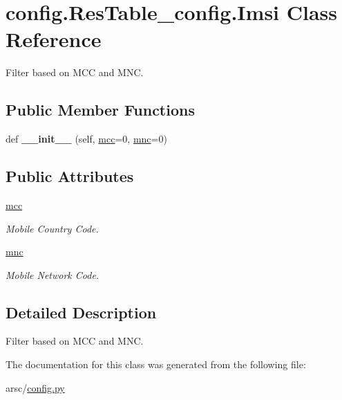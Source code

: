 \hypertarget{classconfig_1_1ResTable__config_1_1Imsi}{}\section{config.\+Res\+Table\+\_\+config.\+Imsi Class Reference}
\label{classconfig_1_1ResTable__config_1_1Imsi}


Filter based on M\+CC and M\+NC.  


\subsection*{Public Member Functions}
\begin{DoxyCompactItemize}
\item 
\mbox{\label{classconfig_1_1ResTable__config_1_1Imsi_abbf54b6868b5c96aa2d4eb761bf8975e}} 
def {\bfseries \+\_\+\+\_\+init\+\_\+\+\_\+} (self, \mbox{\hyperlink{classconfig_1_1ResTable__config_1_1Imsi_aadc7fa399b027b83294b354acc6b2cbc}{mcc}}=0, \mbox{\hyperlink{classconfig_1_1ResTable__config_1_1Imsi_a834fee2734fbfecfd98937e4d64015d5}{mnc}}=0)
\end{DoxyCompactItemize}
\subsection*{Public Attributes}
\begin{DoxyCompactItemize}
\item 
\mbox{\label{classconfig_1_1ResTable__config_1_1Imsi_aadc7fa399b027b83294b354acc6b2cbc}} 
\mbox{\hyperlink{classconfig_1_1ResTable__config_1_1Imsi_aadc7fa399b027b83294b354acc6b2cbc}{mcc}}
\begin{DoxyCompactList}\small\item\em Mobile Country Code. \end{DoxyCompactList}\item 
\mbox{\label{classconfig_1_1ResTable__config_1_1Imsi_a834fee2734fbfecfd98937e4d64015d5}} 
\mbox{\hyperlink{classconfig_1_1ResTable__config_1_1Imsi_a834fee2734fbfecfd98937e4d64015d5}{mnc}}
\begin{DoxyCompactList}\small\item\em Mobile Network Code. \end{DoxyCompactList}\end{DoxyCompactItemize}


\subsection{Detailed Description}
Filter based on M\+CC and M\+NC. 

The documentation for this class was generated from the following file\+:\begin{DoxyCompactItemize}
\item 
arsc/\mbox{\hyperlink{config_8py}{config.\+py}}\end{DoxyCompactItemize}
